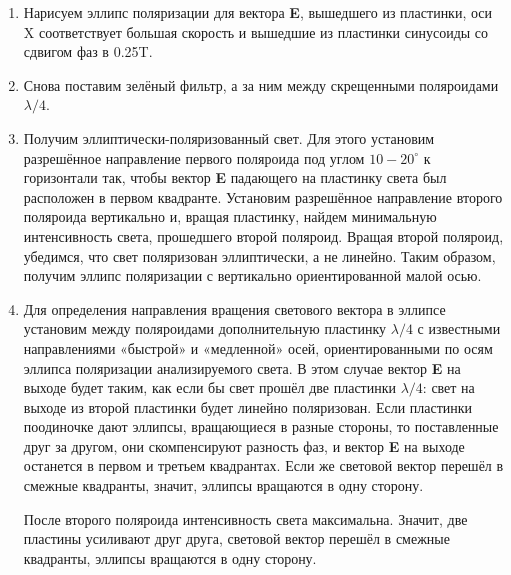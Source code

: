 \documentclass[15pt,a5paper,reqno]{article}
\begin{document}
\begin{enumerate}

    \item Нарисуем эллипс поляризации для вектора \textbf{E}, вышедшего из пластинки, оси X соответствует большая скорость и вышедшие из пластинки синусоиды со сдвигом фаз в 0.25T.
    \begin{figure}[h!]
    \end{figure}

    \item  Снова поставим зелёный фильтр,
а за ним между скрещенными поляроидами
$\lambda/4$.
\item Получим эллиптически-поляризованный свет. Для этого установим разрешённое направление первого поляроида под углом $10-20^{\circ}$ к горизонтали так, чтобы вектор \textbf{E} падающего на пластинку света был расположен в первом квадранте.
Установим разрешённое направление второго поляроида вертикально и, вращая пластинку, найдем минимальную
интенсивность света, прошедшего второй поляроид. Вращая второй поляроид, убедимся, что свет поляризован эллиптически,
а не линейно.
Таким образом, получим эллипс поляризации с вертикально ориентированной малой осью.
\item  Для определения направления вращения светового вектора в эллипсе
установим между поляроидами дополнительную пластинку $\lambda/4$ с известными направлениями «быстрой» и «медленной» осей, ориентированными по осям эллипса поляризации анализируемого света.
В этом случае вектор \textbf{E} на выходе будет таким, как если бы свет прошёл две
пластинки $\lambda/4$: свет на выходе из второй пластинки будет линейно поляризован. Если пластинки поодиночке дают эллипсы, вращающиеся в разные стороны, то поставленные друг за другом, они скомпенсируют
разность фаз, и вектор \textbf{E} на выходе останется в первом
и третьем квадрантах. Если
же световой вектор перешёл в смежные квадранты, значит, эллипсы вращаются в одну сторону. 
\par После второго поляроида интенсивность света максимальна. Значит, две пластины усиливают друг друга, световой вектор перешёл в смежные квадранты, эллипсы вращаются в одну сторону.

\end{enumerate}
\end{document}
